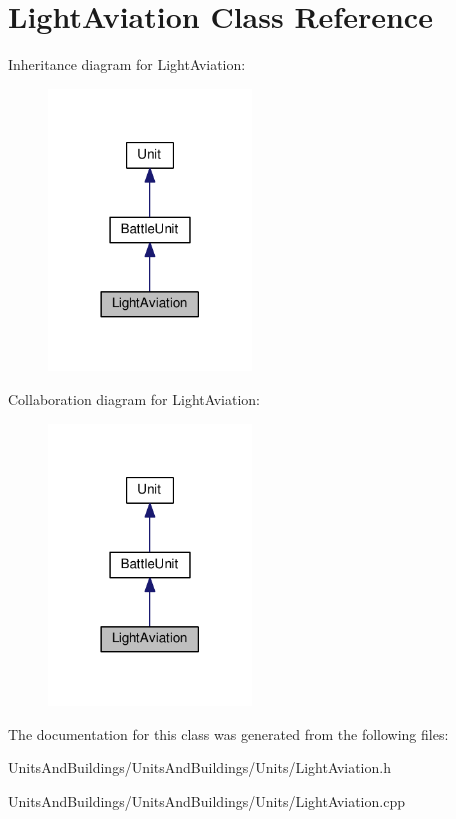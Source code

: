 \hypertarget{class_light_aviation}{}\section{Light\+Aviation Class Reference}
\label{class_light_aviation}


Inheritance diagram for Light\+Aviation\+:
\nopagebreak
\begin{figure}[H]
\begin{center}
\leavevmode
\includegraphics[width=153pt]{class_light_aviation__inherit__graph}
\end{center}
\end{figure}


Collaboration diagram for Light\+Aviation\+:
\nopagebreak
\begin{figure}[H]
\begin{center}
\leavevmode
\includegraphics[width=153pt]{class_light_aviation__coll__graph}
\end{center}
\end{figure}


The documentation for this class was generated from the following files\+:\begin{DoxyCompactItemize}
\item 
Units\+And\+Buildings/\+Units\+And\+Buildings/\+Units/Light\+Aviation.\+h\item 
Units\+And\+Buildings/\+Units\+And\+Buildings/\+Units/Light\+Aviation.\+cpp\end{DoxyCompactItemize}

